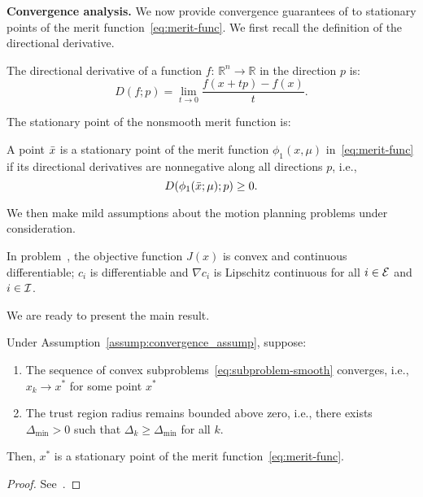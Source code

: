 \textbf{Convergence analysis.} 
We now provide convergence guarantees of \crisp to stationary points of the merit function~\eqref{eq:merit-func}. We first recall the definition of the directional derivative.
\begin{definition}
    The directional derivative of a function $f$: $\mathbb{R}^n \rightarrow \mathbb{R}$ in the direction $p$ is:
        \begin{equation}
        D(f;p) = \lim_{t\rightarrow0} \frac{f(x + tp)-f(x)}{t}.
    \end{equation}
\end{definition}

The stationary point of the nonsmooth merit function is:
\begin{definition}
A point $\Bar{x}$ is a stationary point of the merit function $\phi_1(x,\mu)$ in~\eqref{eq:merit-func} if its directional derivatives are nonnegative along all directions $p$, i.e.,
    \begin{equation}
        D(\phi_1(\Bar{x};\mu);p)\geq 0.
    \end{equation}
\end{definition}

We then make mild assumptions about the motion planning problems under consideration.
\begin{assumption}[Convexity]\label{assump:convergence_assump}
In problem~, the objective function $J(x)$ is convex and continuous differentiable; $c_i$ is differentiable and $\nabla c_i$ is Lipschitz continuous for all $i\in{\cal E}$ and $i\in{\cal I}$.
\end{assumption}
We are ready to present the main result.
\begin{theorem}[Convergence]
\label{thm:local_convergence}
Under Assumption~\ref{assump:convergence_assump}, suppose:
\begin{enumerate}
    \item The sequence of convex subproblems~\eqref{eq:subproblem-smooth} converges, i.e., $x_k\rightarrow x^*$ for some point $x^*$
    \item The trust region radius remains bounded above zero, i.e., there exists $\Delta_{\min} > 0$ such that $\Delta_k \geq \Delta_{\min}$ for all $k$.
\end{enumerate}
Then, $x^*$ is a stationary point of the merit function~\eqref{eq:merit-func}.
\end{theorem}
\begin{proof}
    See~.
\end{proof}

